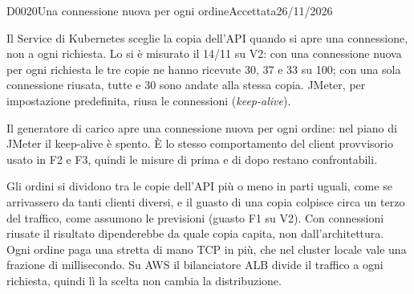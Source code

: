 \begin{decisione}{D0020}{Una connessione nuova per ogni ordine}{Accettata}{26/11/2026}

\contesto
Il Service di Kubernetes sceglie la copia dell'API quando si apre una connessione, non a ogni richiesta. Lo si è misurato il 14/11 su V2: con una connessione nuova per ogni richiesta le tre copie ne hanno ricevute 30, 37 e 33 su 100; con una sola connessione riusata, tutte e 30 sono andate alla stessa copia. JMeter, per impostazione predefinita, riusa le connessioni (\emph{keep-alive}).

\scelta
Il generatore di carico apre una connessione nuova per ogni ordine: nel piano di JMeter il keep-alive è spento. È lo stesso comportamento del client provvisorio usato in F2 e F3, quindi le misure di prima e di dopo restano confrontabili.

\conseguenze
Gli ordini si dividono tra le copie dell'API più o meno in parti uguali, come se arrivassero da tanti clienti diversi, e il guasto di una copia colpisce circa un terzo del traffico, come assumono le previsioni (guasto F1 su V2). Con connessioni riusate il risultato dipenderebbe da quale copia capita, non dall'architettura. Ogni ordine paga una stretta di mano TCP in più, che nel cluster locale vale una frazione di millisecondo. Su AWS il bilanciatore ALB divide il traffico a ogni richiesta, quindi lì la scelta non cambia la distribuzione.

\end{decisione}
